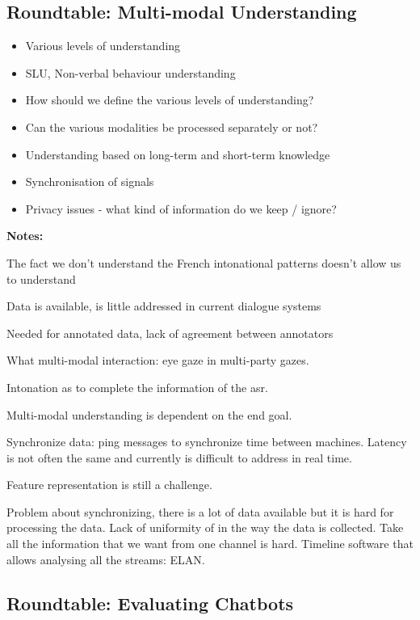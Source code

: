 \documentclass[12pt]{article}
\begin{document}
\subsection{Roundtable: Multi-modal Understanding}

\begin{itemize}
    \item Various levels of understanding
\item SLU, Non-verbal behaviour understanding
\item How should we define the various levels of understanding?
\item Can the various modalities be processed separately or not?
\item Understanding based on long-term and short-term knowledge
\item Synchronisation of signals
\item Privacy issues - what kind of information do we keep / ignore?
\end{itemize}

{\bf Notes:}

The fact we don’t understand the French intonational patterns doesn’t allow us to understand

Data is available, is little addressed in current dialogue systems

Needed for annotated data, lack of agreement between annotators

What multi-modal interaction: eye gaze in multi-party gazes.

Intonation as to complete the information of the asr.

Multi-modal understanding is dependent on the end goal.

Synchronize data: ping messages to synchronize time between machines. Latency is not often the same and currently is difficult to address in real time.

Feature representation is still a challenge.

Problem about synchronizing, there is a lot of data available but it is hard for processing the data. Lack of uniformity of in the way the data is collected. Take all the information that we want from one channel is hard. Timeline software that allows analysing all the streams: ELAN.

\subsection{Roundtable: Evaluating Chatbots}
\end{document}
